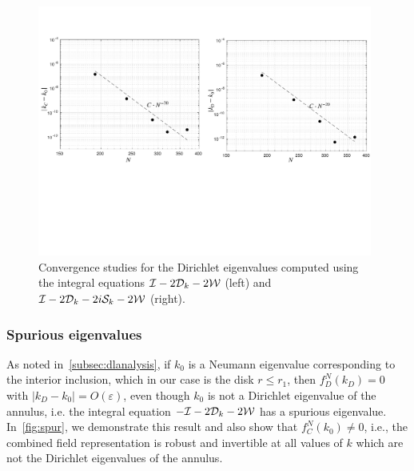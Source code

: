 \begin{figure}
  \centering
  \includegraphics[width=0.98\textwidth]{fig/conv-studies.pdf}
  \caption{Convergence studies for the Dirichlet eigenvalues
  computed using the integral equations 
  $\mathcal I - 2{\mathcal D}_{k} - 2{\mathcal W}$ (left) and
  $\mathcal I - 2{\mathcal D}_{k} - 2i {\mathcal S}_{k} - 2{\mathcal W}$ (right).}
  \label{fig:conv}
\end{figure}

\subsubsection{Spurious eigenvalues}
\label{subsec:spurannulus}
As noted in~\cref{subsec:dlanalysis},
if $k_{0}$ is a Neumann eigenvalue corresponding to the interior
inclusion, which in our case is the disk $r\leq r_{1}$, then
$f_{D}^{N}(k_{D}) = 0$ with $|k_{D}-k_{0}| = O(\varepsilon)$, even though $k_{0}$ 
is not a Dirichlet eigenvalue of the annulus, i.e.
the integral equation $-\mathcal I - 2{\mathcal D}_{k} -2{\mathcal W}$ has a spurious eigenvalue.
In~\cref{fig:spur}, we demonstrate this result and also show that 
$f_{C}^{N}(k_{0}) \neq 0$, i.e., the combined field representation is
robust and invertible at all values of $k$ which are not the Dirichlet
eigenvalues of the annulus.


